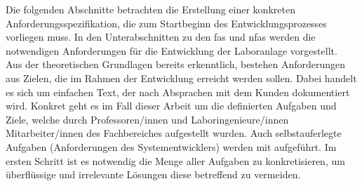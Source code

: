 \documentclass[../../../Bachelorarbeit.tex]{subfiles}
\begin{document}
Die folgenden Abschnitte betrachten die Erstellung einer konkreten Anforderungsspezifikation, die zum Startbeginn des Entwicklungsprozesses vorliegen muss. In den Unterabschnitten zu den \acp{fa} und \acp{nfa} werden die notwendigen Anforderungen für die Entwicklung der Laboranlage vorgestellt. \\
Aus der theoretischen Grundlagen bereits erkenntlich, bestehen Anforderungen aus Zielen, die im Rahmen der Entwicklung erreicht werden sollen. Dabei handelt es sich um einfachen Text, der nach Absprachen mit dem Kunden dokumentiert wird. Konkret geht es im Fall dieser Arbeit um die definierten Aufgaben und Ziele, welche durch Professoren/innen und Laboringenieure/innen \bzw Mitarbeiter/innen des Fachbereiches aufgestellt wurden. Auch selbstauferlegte Aufgaben (Anforderungen des Systementwicklers) werden mit aufgeführt. Im ersten Schritt ist es notwendig die Menge aller Aufgaben zu konkretisieren, um überflüssige und irrelevante Lösungen diese betreffend zu vermeiden.\\
\end{document}

